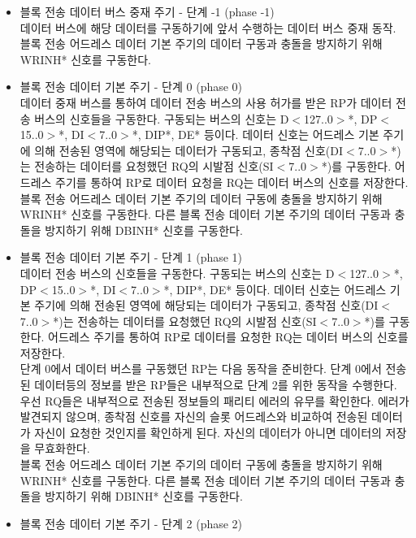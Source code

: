\begin{itemize}
	\item 블록 전송 데이터 버스 중재 주기 - 단계 -1 (phase -1)\\
	데이터 버스에 해당 데이터를 구동하기에 앞서 수행하는 데이터 버스 중재 동작. \\
	블록 전송 어드레스 데이터 기본 주기의 데이터 구동과 충돌을 방지하기 위해
	WRINH* 신호를 구동한다.
%
	\item 블록 전송 데이터 기본 주기 - 단계 0 (phase 0)\\
	데이터 중재 버스를 통하여 데이터 전송 버스의 사용 허가를 받은 RP가
	데이터 전송 버스의 신호들을 구동한다.
	구동되는 버스의 신호는 D$<$127..0$>$*, DP$<$15..0$>$*,
	DI$<$7..0$>$*, DIP*, DE* 등이다.
	데이터 신호는 어드레스 기본 주기에 의해 전송된 영역에 해당되는 데이터가 구동되고,
	종착점 신호(DI$<$7..0$>$*)는 전송하는 데이터를 요청했던
	RQ의 시발점 신호(SI$<$7..0$>$*)를 구동한다.
	어드레스 주기를 통하여 RP로 데이터 요청을 RQ는
	데이터 버스의 신호를 저장한다. \\
	블록 전송 어드레스 데이터 기본 주기의 데이터 구동에 충돌을 방지하기 위해
	WRINH* 신호를 구동한다.
	다른 블록 전송 데이터 기본 주기의 데이터 구동과 충돌을 방지하기 위해
	DBINH* 신호를 구동한다.
%
	\item 블록 전송 데이터 기본 주기 - 단계 1 (phase 1)\\
	데이터 전송 버스의 신호들을 구동한다.
	구동되는 버스의 신호는 D$<$127..0$>$*, DP$<$15..0$>$*,
	DI$<$7..0$>$*, DIP*, DE* 등이다.
	데이터 신호는 어드레스 기본 주기에 의해 전송된 영역에 해당되는 데이터가 구동되고,
	종착점 신호(DI$<$7..0$>$*)는 전송하는 데이터를 요청했던
	RQ의 시발점 신호(SI$<$7..0$>$*)를 구동한다.
	어드레스 주기를 통하여 RP로 데이터를 요청한 RQ는
	데이터 버스의 신호를 저장한다. \\
	단계 0에서 데이터 버스를 구동했던 RP는 다음 동작을 준비한다.
	단계 0에서 전송된 데이터등의 정보를 받은 RP들은 내부적으로  단계 2를 위한 동작을 수행한다.
	우선 RQ들은 내부적으로 전송된 정보들의 패리티 에러의 유무를 확인한다.
	에러가 발견되지 않으며, 종착점 신호를 자신의 슬롯 어드레스와 비교하여
	전송된 데이터가 자신이 요청한 것인지를 확인하게 된다.
	자신의 데이터가 아니면 데이터의 저장을 무효화한다. \\
	블록 전송 어드레스 데이터 기본 주기의 데이터 구동에 충돌을 방지하기 위해
	WRINH* 신호를 구동한다.
	다른 블록 전송 데이터 기본 주기의 데이터 구동과 충돌을 방지하기 위해
	DBINH* 신호를 구동한다.
%
	\item 블록 전송 데이터 기본 주기 - 단계 2 (phase 2)\\

\end{itemize}
